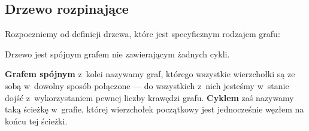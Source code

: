 \subsection{Drzewo rozpinające}



Rozpoczniemy od definicji drzewa, które jest specyficznym rodzajem grafu:

\begin{definition}
	Drzewo jest spójnym grafem nie zawierającym żadnych cykli.
\end{definition}

\textbf{Grafem spójnym} z~kolei nazywamy graf, którego wszystkie wierzchołki są ze sobą w~dowolny sposób połączone --- do wszystkich z~nich jesteśmy w~stanie dojść z~wykorzystaniem pewnej liczby krawędzi grafu.
\textbf{Cyklem} zaś nazywamy taką ścieżkę w~grafie, której wierzchołek początkowy jest jednocześnie węzłem na końcu tej ścieżki.

